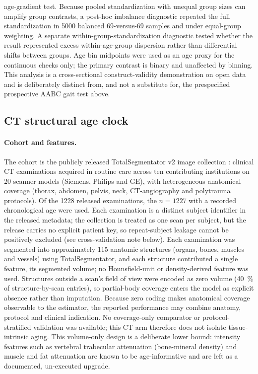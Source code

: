 \documentclass[11pt]{article}
\begin{document}
age-gradient test. Because pooled standardization with unequal group sizes can
amplify group contrasts, a post-hoc imbalance diagnostic repeated the full
standardization in \num{5000} balanced \num{69}-versus-\num{69} samples and
under equal-group weighting. A separate within-group-standardization diagnostic
tested whether the result represented excess within-age-group dispersion rather
than differential shifts between groups. Age bin midpoints were used as an age proxy for the continuous checks only;
the primary contrast is binary and unaffected by binning. This analysis is a cross-sectional
construct-validity demonstration on open data and is deliberately distinct from, and not a
substitute for, the prespecified prospective AABC gait test above.

\subsection{CT structural age clock}

\paragraph{Cohort and features.} The cohort is the publicly released
TotalSegmentator v2 image collection \citep{wasserthal2023totalsegmentator}: clinical CT
examinations acquired in routine care across ten contributing institutions on \num{20}
scanner models (Siemens, Philips and GE), with heterogeneous anatomical coverage (thorax,
abdomen, pelvis, neck, CT-angiography and polytrauma protocols). Of the \num{1228} released
examinations, the $n=\num{1227}$ with a recorded chronological age were used. Each
examination is a distinct subject identifier in the released metadata; the collection is
treated as one scan per subject, but the release carries no explicit patient key, so
repeat-subject leakage cannot be positively excluded (see cross-validation note below).
Each examination was segmented into approximately \num{115} anatomic structures (organs,
bones, muscles and vessels) using TotalSegmentator, and each structure contributed a single
feature, its segmented volume; no Hounsfield-unit or density-derived feature was used.
Structures outside a scan's field of view were encoded as zero volume (\SI{40}{\percent} of
structure-by-scan entries), so partial-body coverage enters the model as explicit absence
rather than imputation. Because zero coding makes anatomical coverage observable
to the estimator, the reported performance may combine anatomy, protocol and
clinical indication. No coverage-only comparator or protocol-stratified
validation was available; this CT arm therefore does not isolate tissue-intrinsic
aging. This volume-only design is a deliberate lower bound: intensity
features such as vertebral trabecular attenuation (bone-mineral density) and
muscle and fat attenuation are known to be age-informative and are left as a
documented, un-executed upgrade.
\end{document}
